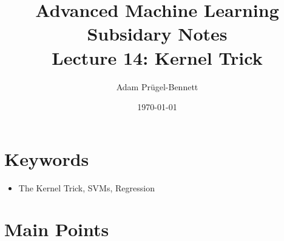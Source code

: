 \documentclass[11pt]{article}
\author{Adam Prügel-Bennett}
\date{\today}
\title{Advanced Machine Learning Subsidary Notes\\\medskip
\large Lecture 14: Kernel Trick}
\begin{document}
\maketitle


\section{Keywords}
\label{sec:org1db7803}
\begin{itemize}
\item The Kernel Trick, SVMs, Regression
\end{itemize}

\section{Main Points}
\label{sec:org5d2f1df}
\end{document}
